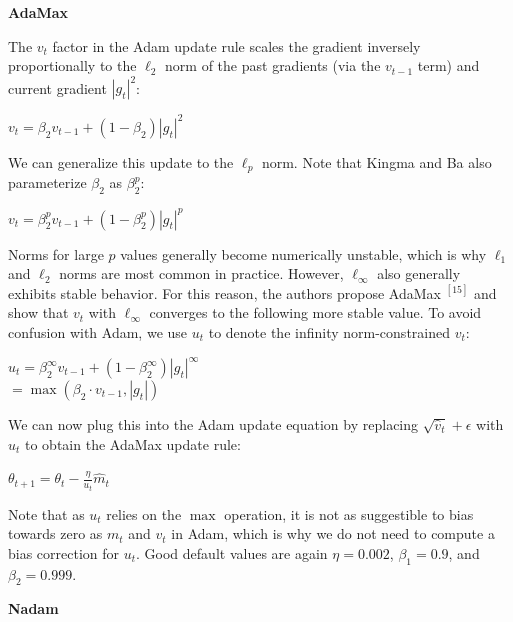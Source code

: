 \documentclass[4pt,journal,compsoc]{IEEEtran}
\begin{document}
\begin{flushleft}
    \textbf{\Large AdaMax} \newline
    
    The $v_t$ factor in the Adam update rule scales the gradient inversely proportionally to the $\ell_2$ norm of the past gradients (via the $v_{t-1}$ term) and current gradient $|g_t|^2$: \newline
    
    $v_t = \beta_2 v_{t-1} + (1 - \beta_2) |g_t|^2$ \newline

    We can generalize this update to the $\ell_p$ norm. Note that Kingma and Ba also parameterize $\beta_2$ as $\beta^p_2$: \newline
    
    $v_t = \beta_2^p v_{t-1} + (1 - \beta_2^p) |g_t|^p$ \newline

    Norms for large $p$ values generally become numerically unstable, which is why $\ell_1$ and $\ell_2$ norms are most common in practice. However, $\ell_\infty$ also generally exhibits stable behavior. For this reason, the authors propose AdaMax $^ {[15]}$ and show that $v_t$ with $\ell_\infty$ converges to the following more stable value. To avoid confusion with Adam, we use $u_t$ to denote the infinity norm-constrained $v_t$: \newline
    
    $u_t = \beta_2^\infty v_{t-1} + (1 - \beta_2^\infty) |g_t|^\infty$\\
    $ = \max(\beta_2 \cdot v_{t-1}, |g_t|)$ \newline
    
    We can now plug this into the Adam update equation by replacing $\sqrt{\hat{v}_t} + \epsilon$ with $u_t$ to obtain the AdaMax update rule: \newline
    
    $\theta_{t+1} = \theta_{t} - \frac{\eta}{u_t} \hat{m}_t$ \newline

    Note that as $u_t$ relies on the $\max$ operation, it is not as suggestible to bias towards zero as $m_t$ and $v_t$ in Adam, which is why we do not need to compute a bias correction for $u_t$. Good default values are again $\eta = 0.002$, $\beta_1 = 0.9$, and $\beta_2 = 0.999$. \newline \newline
    
    \textbf{\Large Nadam} \newline
    

\end{flushleft}
\end{document}
